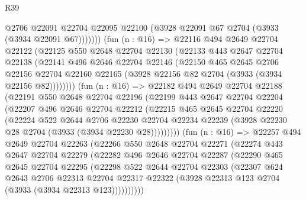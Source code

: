 \begin{lexlean}{R39}
\begin{coremodule}
                @2706
                @22091
                @22704
                @22095
                @22100
                (@3928 @22091 @67 @2704 (@3933 (@3934 @22091 @67)))))))
        (fun (n : @16) =>
        @22116
          @494
          @2649
          @22704
          @22122
          (@22125
            @550
            @2648
            @22704
            @22130
            (@22133
              @443
              @2647
              @22704
              @22138
              (@22141
                @496
                @2646
                @22704
                @22146
                (@22150
                  @465
                  @2645
                  @2706
                  @22156
                  @22704
                  @22160
                  @22165
                  (@3928 @22156 @82 @2704 (@3933 (@3934 @22156 @82))))))))
        (fun (n : @16) =>
        @22182
          @494
          @2649
          @22704
          @22188
          (@22191
            @550
            @2648
            @22704
            @22196
            (@22199
              @443
              @2647
              @22704
              @22204
              (@22207
                @496
                @2646
                @22704
                @22212
                (@22215
                  @465
                  @2645
                  @22704
                  @22220
                  (@22224
                    @522
                    @2644
                    @2706
                    @22230
                    @22704
                    @22234
                    @22239
                    (@3928 @22230 @28 @2704 (@3933 (@3934 @22230 @28)))))))))
        (fun (n : @16) =>
        @22257
          @494
          @2649
          @22704
          @22263
          (@22266
            @550
            @2648
            @22704
            @22271
            (@22274
              @443
              @2647
              @22704
              @22279
              (@22282
                @496
                @2646
                @22704
                @22287
                (@22290
                  @465
                  @2645
                  @22704
                  @22295
                  (@22298
                    @522
                    @2644
                    @22704
                    @22303
                    (@22307
                      @624
                      @2643
                      @2706
                      @22313
                      @22704
                      @22317
                      @22322
                      (@3928 @22313 @123 @2704 (@3933 (@3934 @22313 @123))))))))))

\end{coremodule}
\end{lexlean}
